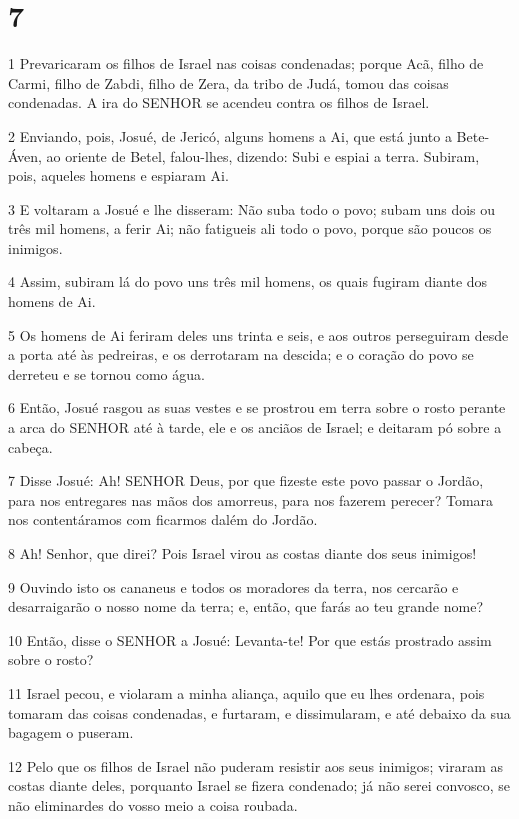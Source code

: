 \chapter{7}

\par 1 Prevaricaram os filhos de Israel nas coisas condenadas; porque Acã, filho de Carmi, filho de Zabdi, filho de Zera, da tribo de Judá, tomou das coisas condenadas. A ira do SENHOR se acendeu contra os filhos de Israel.
\par 2 Enviando, pois, Josué, de Jericó, alguns homens a Ai, que está junto a Bete-Áven, ao oriente de Betel, falou-lhes, dizendo: Subi e espiai a terra. Subiram, pois, aqueles homens e espiaram Ai.
\par 3 E voltaram a Josué e lhe disseram: Não suba todo o povo; subam uns dois ou três mil homens, a ferir Ai; não fatigueis ali todo o povo, porque são poucos os inimigos.
\par 4 Assim, subiram lá do povo uns três mil homens, os quais fugiram diante dos homens de Ai.
\par 5 Os homens de Ai feriram deles uns trinta e seis, e aos outros perseguiram desde a porta até às pedreiras, e os derrotaram na descida; e o coração do povo se derreteu e se tornou como água.
\par 6 Então, Josué rasgou as suas vestes e se prostrou em terra sobre o rosto perante a arca do SENHOR até à tarde, ele e os anciãos de Israel; e deitaram pó sobre a cabeça.
\par 7 Disse Josué: Ah! SENHOR Deus, por que fizeste este povo passar o Jordão, para nos entregares nas mãos dos amorreus, para nos fazerem perecer? Tomara nos contentáramos com ficarmos dalém do Jordão.
\par 8 Ah! Senhor, que direi? Pois Israel virou as costas diante dos seus inimigos!
\par 9 Ouvindo isto os cananeus e todos os moradores da terra, nos cercarão e desarraigarão o nosso nome da terra; e, então, que farás ao teu grande nome?
\par 10 Então, disse o SENHOR a Josué: Levanta-te! Por que estás prostrado assim sobre o rosto?
\par 11 Israel pecou, e violaram a minha aliança, aquilo que eu lhes ordenara, pois tomaram das coisas condenadas, e furtaram, e dissimularam, e até debaixo da sua bagagem o puseram.
\par 12 Pelo que os filhos de Israel não puderam resistir aos seus inimigos; viraram as costas diante deles, porquanto Israel se fizera condenado; já não serei convosco, se não eliminardes do vosso meio a coisa roubada.
